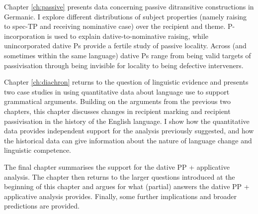 Chapter \ref{ch:passive} presents data concerning passive ditransitive constructions in Germanic. I explore different distributions of subject properties (namely raising to spec-TP and receiving nominative case) over the recipient and theme. P-incorporation is used to explain dative-to-nominative raising, while unincorporated dative Ps provide a fertile study of passive locality. Across (and sometimes within the same language) dative Ps range from being valid targets of passivisation through being invisible for locality to being defective interveners.

Chapter \ref{ch:diachron} returns to the question of linguistic evidence and presents two case studies in using quantitative data about language use to support grammatical arguments. Building on the arguments from the previous two chapters, this chapter discusses changes in recipient marking and recipient passivisation in the history of the English language. I show how the quantitative data provides independent support for the analysis previously suggested, and how the historical data can give information about the nature of language change and linguistic competence.

The final chapter summarises the support for the dative PP + applicative analysis. The chapter then returns to the larger questions introduced at the beginning of this chapter and argues for what (partial) answers the dative PP + applicative analysis provides. Finally, some further implications and broader predictions are provided. 
%
